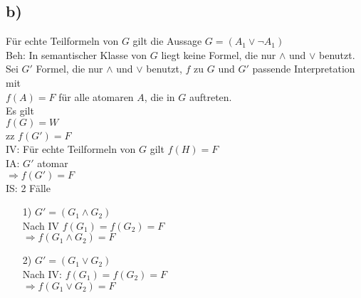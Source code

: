 \documentclass[a4paper]{scrartcl}
\begin{document}
\subsection*{b)}

Für echte Teilformeln von $G$ gilt die Aussage $G = (A_1 \vee \neg A_1)$\\

\noindent
Beh: In semantischer Klasse von $G$ liegt keine Formel, die nur $\wedge$ und $\vee$ benutzt.\\
Sei $G'$ Formel, die nur $\wedge$ und $\vee$ benutzt, $f$ zu $G$ und $G'$ passende Interpretation mit\\
$f(A) = F$ für alle atomaren $A$, die in $G$ auftreten.\\
Es gilt\\
$f(G) = W$\\
zz $f(G') = F$\\

\noindent
IV: Für echte Teilformeln von $G$ gilt $f(H) = F$\\
IA: $G'$ atomar\\
$\Rightarrow f(G') = F$\\
IS: 2 Fälle
\begin{enumerate}
\item[1)] $G' = (G_1 \wedge G_2)$\\
Nach IV $f(G_1) = f(G_2) = F$\\
$\Rightarrow f(G_1 \wedge G_2) = F$\\

\item[2)] $G' = (G_1 \vee G_2)$\\
Nach IV: $f(G_1) = f(G_2) = F$\\
$\Rightarrow f(G_1 \vee G_2) = F$\\
\end{enumerate}
\end{document}
